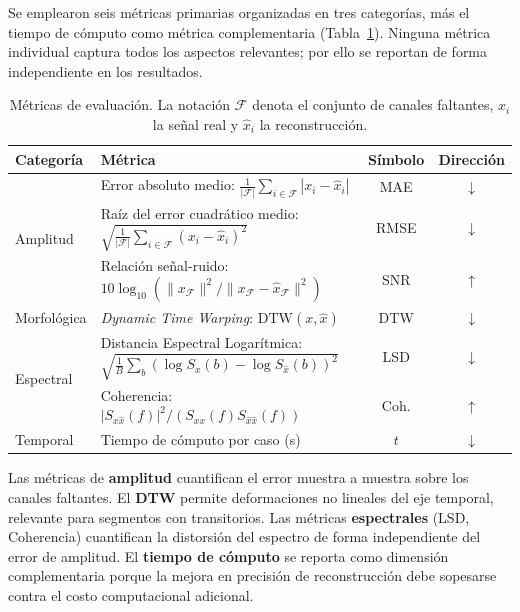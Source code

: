 Se emplearon seis métricas primarias organizadas en tres categorías, más el tiempo de cómputo como métrica complementaria (Tabla~\ref{tab:metrics}). Ninguna métrica individual captura todos los aspectos relevantes; por ello se reportan de forma independiente en los resultados.

\begin{table}[htbp]
\centering
\caption{Métricas de evaluación. La notación $\mathcal{F}$ denota el conjunto de canales faltantes, $x_i$ la señal real y $\hat{x}_i$ la reconstrucción.}
\label{tab:metrics}
\footnotesize
\begin{tabular}{@{}p{2.0cm}p{6.7cm}cc@{}}
\toprule
Categoría & Métrica & Símbolo & Dirección \\
\midrule
\multirow{3}{*}{Amplitud} 
& Error absoluto medio: $\frac{1}{|\mathcal{F}|}\sum_{i\in\mathcal{F}}|x_i-\hat{x}_i|$ 
& MAE & $\downarrow$ \\
& Raíz del error cuadrático medio: $\sqrt{\frac{1}{|\mathcal{F}|}\sum_{i\in\mathcal{F}}(x_i-\hat{x}_i)^2}$ 
& RMSE & $\downarrow$ \\
& Relación señal-ruido: $10\log_{10}(\|x_{\mathcal{F}}\|^2/\|x_{\mathcal{F}}-\hat{x}_{\mathcal{F}}\|^2)$ 
& SNR & $\uparrow$ \\
\midrule
Morfológica 
& \textit{Dynamic Time Warping}: $\mathrm{DTW}(x,\hat{x})$ 
& DTW & $\downarrow$ \\
\midrule
\multirow{2}{*}{Espectral} 
& Distancia Espectral Logarítmica: $\sqrt{\frac{1}{B}\sum_b (\log S_x(b)-\log S_{\hat{x}}(b))^2}$ 
& LSD & $\downarrow$ \\
& Coherencia: $|S_{x\hat{x}}(f)|^2/(S_{xx}(f)S_{\hat{x}\hat{x}}(f))$ 
& Coh. & $\uparrow$ \\
\midrule
Temporal & Tiempo de cómputo por caso (s) & $t$ & $\downarrow$ \\
\bottomrule
\end{tabular}
\end{table}

Las métricas de \textbf{amplitud} cuantifican el error muestra a muestra sobre los canales faltantes. El \textbf{DTW} permite deformaciones no lineales del eje temporal, relevante para segmentos con transitorios. Las métricas \textbf{espectrales} (LSD, Coherencia) cuantifican la distorsión del espectro de forma independiente del error de amplitud. El \textbf{tiempo de cómputo} se reporta como dimensión complementaria porque la mejora en precisión de reconstrucción debe sopesarse contra el costo computacional adicional.

